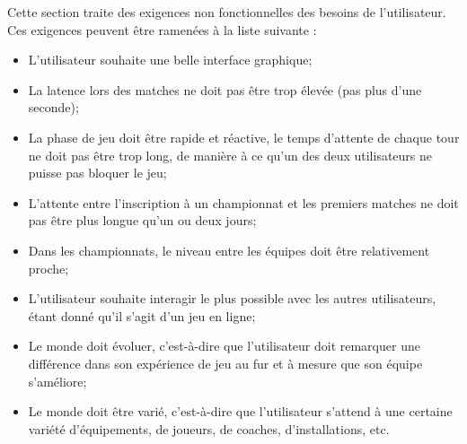 
Cette section traite des exigences non fonctionnelles des besoins de l'utilisateur. Ces exigences peuvent être ramenées à la liste suivante :
\begin{itemize}
\item L'utilisateur souhaite une belle interface graphique;
\item La latence lors des matches ne doit pas être trop élevée (pas plus 
	   d'une seconde);
\item La phase de jeu doit être rapide et réactive, le temps d'attente de 
	   chaque tour ne doit pas être trop long, de manière à ce qu'un des deux 
	   utilisateurs ne puisse pas bloquer le jeu;
\item L'attente entre l'inscription à un championnat et les premiers matches ne 
	   doit pas être plus longue qu'un ou deux jours;
\item Dans les championnats, le niveau entre les équipes doit être 
	   relativement proche;
\item L'utilisateur souhaite interagir le plus possible avec les autres 
	   utilisateurs, étant donné qu'il s'agit d'un jeu en ligne;
\item Le monde doit évoluer, c'est-à-dire que l'utilisateur doit remarquer 
	   une différence dans son expérience de jeu au fur et à mesure que son équipe 
	   s'améliore;
\item Le monde doit être varié, c'est-à-dire que l'utilisateur s'attend à 
	   une certaine variété d'équipements, de joueurs, de coaches, d'installations, etc.
\end{itemize}
